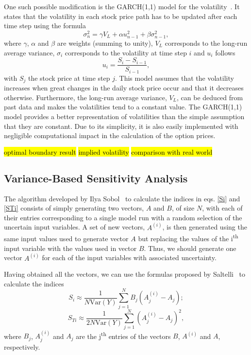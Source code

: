 \documentclass[a4paper,twocolumn,aps,prd,longbibliography,superscriptaddress]{revtex4-1}
\begin{document}
One such possible modification is the GARCH(1,1) model for the volatility~\cite{Wei}.
It states that the volatility in each stock price path has to be updated after each time step using the formula
\begin{equation}
\sigma_n^2=\gamma V_L+\alpha u_{n-1}^2+\beta\sigma_{n-1}^2,
\end{equation}
\noindent where $\gamma$, $\alpha$ and $\beta$ are weights (summing to unity), $V_L$ corresponds to the long-run average variance, $\sigma_i$ corresponds to the volatility at time step $i$ and $u_i$ follows
\begin{equation}
u_i=\frac{S_i-S_{i-1}}{S_{i-1}},
\end{equation}
\noindent with $S_j$ the stock price at time step $j$.
This model assumes that the volatility increases when great changes in the daily stock price occur and that it decreases otherwise. Furthermore, the long-run average variance, $V_L$, can be deduced from past data and makes the volatilities tend to a constant value.
The GARCH(1,1) model provides a better representation of volatilities than the simple assumption that they are constant. Due to its simplicity, it is also easily implemented with negligible computational impact in the calculation of the option prices.

\hl{optimal boundary result}
\hl{implied volatility}
\hl{comparison with real world}

\subsection{Variance-Based Sensitivity Analysis}
The algorithm developed by Ilya Sobol~\cite{Sobol} to calculate the indices in eqs. \eqref{Si} and \eqref{STi} consists of simply generating two vectors, $A$ and $B$, of size $N$, with each of their entries corresponding to a single model run with a random selection of the uncertain input variables.
A set of new vectors, $A^{(i)}$, is then generated using the same input values used to generate vector $A$ but replacing the values of the i\textsuperscript{th} input variable with the values used in vector $B$. Thus, we should generate one vector $A^{(i)}$ for each of the input variables with associated uncertainty.

Having obtained all the vectors, we can use the formulas proposed by Saltelli~\cite{Saltelli2} to calculate the indices
\begin{equation}\label{Si2}
S_i\approx\frac{1}{N\mathrm{Var}(Y)}\sum_{j=1}^NB_j\left(A^{(i)}_j-A_j\right);
\end{equation}
\begin{equation}\label{STi2}
S_{Ti}\approx\frac{1}{2N\mathrm{Var}(Y)}\sum_{j=1}^N\left(A^{(i)}_j-A_j\right)^2,
\end{equation}
\noindent where $B_j$, $A^{(i)}_j$ and $A_j$ are the j\textsuperscript{th} entries of the vectors $B$, $A^{(i)}$ and $A$, respectively.
\end{document}
